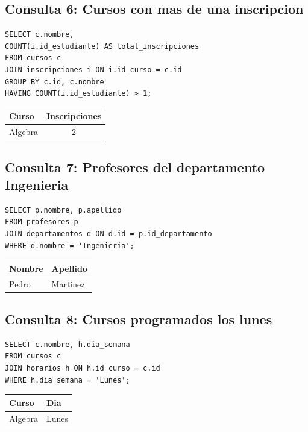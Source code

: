 \documentclass[12pt,a4paper]{article}
\begin{document}
\subsection{Consulta 6: Cursos con mas de una inscripcion}

\begin{lstlisting}
SELECT c.nombre,
COUNT(i.id_estudiante) AS total_inscripciones
FROM cursos c
JOIN inscripciones i ON i.id_curso = c.id
GROUP BY c.id, c.nombre
HAVING COUNT(i.id_estudiante) > 1;
\end{lstlisting}

\begin{center}
\begin{tabular}{|l|c|}
\hline
Curso & Inscripciones \\
\hline
Algebra & 2 \\
\hline
\end{tabular}
\end{center}

\subsection{Consulta 7: Profesores del departamento Ingenieria}

\begin{lstlisting}
SELECT p.nombre, p.apellido
FROM profesores p
JOIN departamentos d ON d.id = p.id_departamento
WHERE d.nombre = 'Ingenieria';
\end{lstlisting}

\begin{center}
\begin{tabular}{|l|l|}
\hline
Nombre & Apellido \\
\hline
Pedro & Martinez \\
\hline
\end{tabular}
\end{center}


\subsection{Consulta 8: Cursos programados los lunes}

\begin{lstlisting}
SELECT c.nombre, h.dia_semana
FROM cursos c
JOIN horarios h ON h.id_curso = c.id
WHERE h.dia_semana = 'Lunes';
\end{lstlisting}

\begin{center}
\begin{tabular}{|l|l|}
\hline
Curso & Dia \\
\hline
Algebra & Lunes \\
\hline
\end{tabular}
\end{center}
\end{document}
